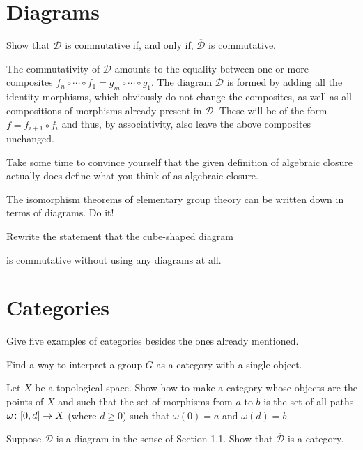 \section{Diagrams}

\bx
Show that $\mathcal{D}$ is commutative if, and only if, $\overline{\mathcal{D}}$ is commutative.
\ex

\bs
The commutativity of $\mathcal{D}$ amounts to the equality between one or more composites $f_n\circ\cdots \circ f_1=g_m\circ \cdots\circ g_1$. The diagram $\overline{\mathcal{D}}$ is formed by adding all the identity morphisms, which obviously do not change the composites, as well as all compositions of morphisms  already present in $\mathcal{D}$. These will be of the form $\widetilde f=f_{i+1}\circ f_i$ and thus, by associativity, also leave the above composites unchanged.
\es

\bx
\ben[label=(\alph*)]
\item Take some time to convince yourself that the given definition of algebraic closure actually does define what you think of as algebraic closure.
\item The isomorphism theorems of elementary group theory can be written down in terms of diagrams. Do it!
\item Rewrite the statement that the cube-shaped diagram 
\bse
{}
\ese
is commutative without using any diagrams at all.
\een
\ex

\bs
\ben[label=(\alph*)]
\item
\item
\item
\een
\es

\section{Categories}

\bx
\ben[label=(\alph*)]
\item Give five examples of categories besides the ones already mentioned.
\item Find a way to interpret a group $G$ as a category with a single object.
\item Let $X$ be a topological space. Show how to make a category whose objects are the points of $X$ and such that the set of morphisms from $a$ to $b$ is the set of all paths $\omega \colon [0, d] \to X$ (where $d \geq 0$) such that $\omega(0) = a$ and $\omega(d) = b$.
\item Suppose $\mathcal{D}$ is a diagram in the sense of Section 1.1. Show that $\overline{\mathcal{D}}$ is a category.
\een
\ex

